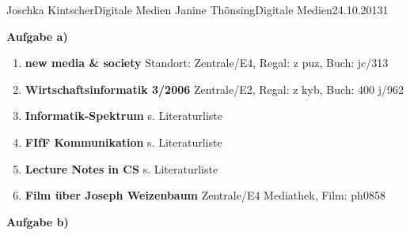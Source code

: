 \documentclass{wa}
\begin{document}
		{Joschka Kintscher}{Digitale Medien}
		{Janine Thönsing}{Digitale Medien}{24.10.2013}{1}


\begin{LARGE}
  \textbf{Aufgabe a)}
\end{LARGE}

\begin{enumerate}
  \item\textbf{new media \& society}
  \newline
  Standort: Zentrale/E4, Regal: z puz, Buch: jc/313
  \newline
  \cite{vergeer2013}
  
  \item\textbf{Wirtschaftsinformatik 3/2006}
  \newline
   Zentrale/E2, Regal: z kyb, Buch: 400 j/962

  \item\textbf{Informatik-Spektrum}
  \newline
  s. Literaturliste

  \item\textbf{FIfF Kommunikation}
  \newline
  s. Literaturliste

  \item\textbf{Lecture Notes in CS}
  \newline
  s. Literaturliste
 
  \item\textbf{Film über Joseph Weizenbaum}
  \newline
  Zentrale/E4 Mediathek, Film: ph0858
  \newline
\end{enumerate}

\begin{LARGE}
  \textbf{Aufgabe b)}
\end{LARGE}


{}

\end{document}
